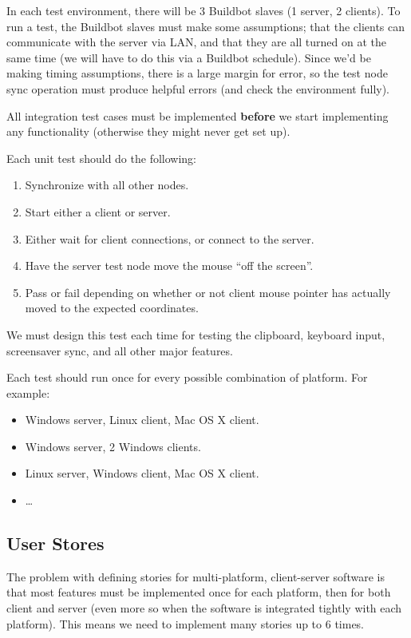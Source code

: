 \documentclass{article}
\begin{document}
In each test environment, there will be 3 Buildbot slaves (1 server, 2 clients).
To run a test, the Buildbot slaves must make some assumptions; that the clients
can communicate with the server via LAN, and that they are all turned on at the 
same time (we will have to do this via a Buildbot schedule). Since we'd be 
making timing assumptions, there is a large margin for error, so the test node
sync operation must produce helpful errors (and check the environment fully).

All integration test cases must be implemented \textbf{before} we start 
implementing any functionality (otherwise they might never get set up).

Each unit test should do the following:

\begin{enumerate}
  \item Synchronize with all other nodes.
  \item Start either a client or server.
  \item Either wait for client connections, or connect to the server.
  \item Have the server test node move the mouse ``off the screen''.
  \item Pass or fail depending on whether or not client mouse pointer has
    actually moved to the expected coordinates.
\end{enumerate}

We must design this test each time for testing the clipboard, keyboard input,
screensaver sync, and all other major features.

Each test should run once for every possible combination of platform. For 
example:

\begin{itemize}
  \item Windows server, Linux client, Mac OS X client.
  \item Windows server, 2 Windows clients.
  \item Linux server, Windows client, Mac OS X client.
  \item \ldots
\end{itemize}

\subsection{User Stores}

The problem with defining stories for multi-platform, client-server software
is that most features must be implemented once for each platform, then for both
client and server (even more so when the software is integrated tightly with
each platform). This means we need to implement many stories up to 6 times.
\end{document}
